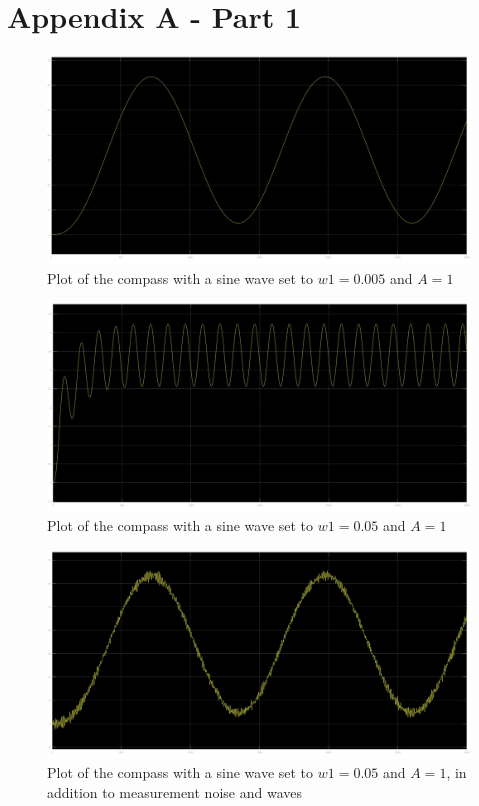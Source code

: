 \section{Appendix A - Part 1}

\begin{figure}[H]
    \centering
    \includegraphics[width=1\textwidth]{Plots/1b_w0005.jpg}
    \caption{Plot of the compass with a sine wave set to $w1 = 0.005$ and $A=1$}
    \label{fig: 1b_w0005}
\end{figure}

\begin{figure}[H]
    \centering
    \includegraphics[width=1\textwidth]{Plots/1b_w005.jpg}
    \caption{Plot of the compass with a sine wave set to $w1 = 0.05$ and $A=1$}
    \label{fig: 1b_w005}
\end{figure}

\begin{figure}[H]
    \centering
    \includegraphics[width=1\textwidth]{Plots/1c_w0005.jpg}
    \caption{Plot of the compass with a sine wave set to $w1 = 0.05$ and $A=1$, in addition to measurement noise and waves}
    \label{fig: 1c_w0005}
\end{figure}

